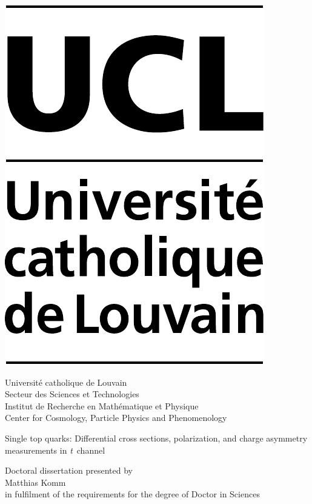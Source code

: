 \begin{clearedpagestyle}

\vspace*{0.5cm}

\parbox[c][][c]{0.2\textwidth}{
\includegraphics[height=2.cm]{figures/title/UCL.pdf}
}\parbox[c][][c]{0.799\textwidth}{\vspace{0.05cm}
\begin{flushright}
\large Universit{\'e} catholique de Louvain\\[0.25\baselineskip]
\normalsize Secteur des Sciences et Technologies\\[0.15\baselineskip] 
Institut de Recherche en Math{\'e}matique et Physique\\[0.15\baselineskip]
Center for Cosmology, Particle Physics and Phenomenology
\end{flushright}
}

\vspace{1.5cm}

\begin{center}

\vspace{0.3cm}

\parbox{0.95\textwidth}{
\selectfont\centering

\textsf{Single top quarks: Differential cross sections, polarization, and charge asymmetry measurements in \textsl{t}~channel}
}

\vspace{0.3cm}

\end{center}
\vspace{0.6cm}

\begin{center}
Doctoral dissertation presented by \\
\vspace{2mm}
{\Large Matthias Komm}\\
\vspace{2mm}
in fulfilment of the requirements for the degree of Doctor in Sciences
\end{center}


\end{clearedpagestyle}
